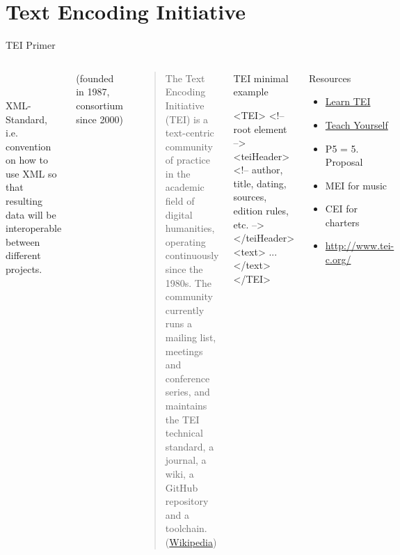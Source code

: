 \section{Text Encoding Initiative}
\begin{frame}[fragile]{TEI Primer}
\footnotesize{}

\begin{columns}
\\
\\
XML-Standard, i.e. convention on how to use XML so that resulting data will be interoperable between different projects.

(founded in 1987, consortium since 2000)

\begin{block}{}
\begin{quote}
    The Text Encoding Initiative (TEI) is a text-centric community of practice in the academic field of digital humanities, operating continuously since the 1980s. The community currently runs a mailing list, meetings and conference series, and maintains the TEI technical standard, a journal, a wiki, a GitHub repository and a toolchain. (\href{https://en.wikipedia.org/wiki/Text_Encoding_Initiative}{Wikipedia})
\end{quote}
\end{block}

\begin{block}{TEI minimal example}
\begin{xmlcode}
<TEI> <!-- root element -->
    <teiHeader> 
      <!-- author, title, dating, 
           sources, edition rules, etc. -->
    </teiHeader> 
    <text> ... </text>
</TEI>
\end{xmlcode}
\end{block}

\begin{block}{Resources}
    \begin{itemize}\scriptsize
        \item \href{http://www.tei-c.org/Support/Learn/}{Learn TEI} 
        \item \href{http://www.tei-c.org/support/learn/teach-yourself-tei/}{Teach Yourself} \item P5 = 5. Proposal 
        \item MEI for music 
        \item CEI for charters 
        \item \href{http://www.tei-c.org/}{http://www.tei-c.org/} 
    \end{itemize}
\end{block}
\end{columns}

\end{frame}

